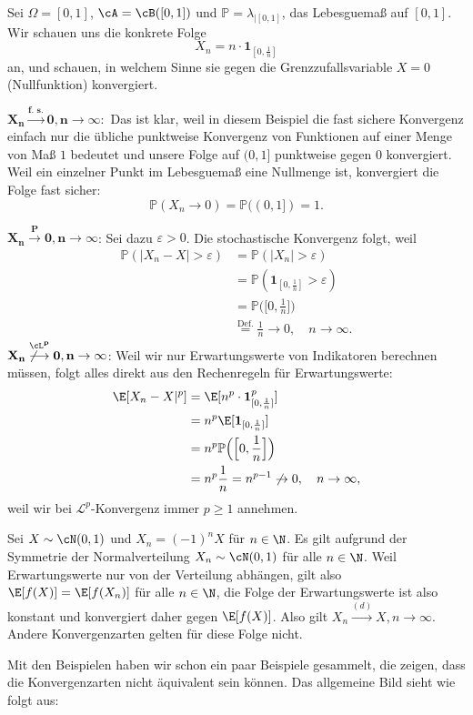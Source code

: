 \begin{beispiel}
	Sei $\Omega = [0,1]$, $\cA = \cB([0,1])$ und $\mathbb{P} = \lambda_{|[0,1]}$, das Lebesguema\ss{} auf $[0,1]$. Wir schauen uns die konkrete Folge $$X_n = n \cdot \mathbf{1}_{[0,\frac{1}{n}]}$$ an, und schauen, in welchem Sinne sie gegen die Grenzzufallsvariable $X=0$ (Nullfunktion) konvergiert. \smallskip
			
	$\mathbf{X_n \overset{\text{f. s.}}{\longrightarrow} 0, n \to \infty:}$ Das ist klar, weil in diesem Beispiel die fast sichere Konvergenz einfach nur die \"ubliche punktweise Konvergenz von Funktionen auf einer Menge von Ma\ss{} $1$ bedeutet und unsere Folge auf $(0,1]$ punktweise gegen $0$ konvergiert. Weil ein einzelner Punkt im Lebesguema\ss{} eine Nullmenge ist, konvergiert die Folge fast sicher:	
	$$\mathbb{P}(X_n \to 0) = \mathbb{P}((0,1]) = 1.$$
	
	$\mathbf{X_n \overset{P}{\longrightarrow} 0, n \to \infty}$:	Sei dazu $\varepsilon > 0$. Die stochastische Konvergenz folgt, weil
	\begin{align*}
		\mathbb{P}(|X_n-X| > \varepsilon) &= \mathbb{P}(|X_n| > \varepsilon) \\
		&= \mathbb{P}(\mathbf{1}_{[0,\frac{1}{n}]} > \varepsilon)\\
		& = \mathbb{P}\Big(\Big[0,\frac{1}{n}\Big]\Big)\\
		&\overset{\text{Def.}}{ =} \frac{1}{n} \to 0, \quad n\to\infty.
	\end{align*}	
	$\mathbf{X_n \overset{\cL^p}{\not\longrightarrow} 0, n \to \infty}$: Weil wir nur Erwartungswerte von Indikatoren berechnen m\"ussen, folgt alles direkt aus den Rechenregeln f\"ur Erwartungswerte:
	\begin{align*}
		\E[X_n-X|^p] & = \E[n^p \cdot \mathbf{1}_{[0,\frac{1}{n}]}^p]\\
		& = n^p \E[ \mathbf{1}_{[0,\frac{1}{n}]}] \\
		&= n^p \mathbb{P}\Big(\Big[0,\frac{1}{n}\Big]\Big) \\
		&= n^p  \frac{1}{n} = n^{p-1} \not\to 0,\quad  n \to \infty,
	\end{align*}
	weil wir bei $\mathcal L^p$-Konvergenz immer $p\geq 1$ annehmen.
\end{beispiel}
\begin{beispiel}
	Sei $X \sim \cN(0,1)$ und $X_n = (-1)^n X$ f\"ur $n\in \N$. Es gilt aufgrund der Symmetrie der Normalverteilung $X_n \sim \cN(0,1)$ f\"ur alle $n\in\N$. Weil Erwartungswerte nur von der Verteilung abh\"angen, gilt also $\E[f(X)]=\E[f(X_n)]$ f\"ur alle $n\in\N$, die Folge der Erwartungswerte ist also konstant und konvergiert daher gegen $\E[f(X)]$. Also gilt $X_n \overset{(d)}{\longrightarrow} X, n\to\infty$. Andere Konvergenzarten gelten f\"ur diese Folge nicht.
\end{beispiel}
Mit den Beispielen haben wir schon ein paar Beispiele gesammelt, die zeigen, dass die Konvergenzarten nicht \"aquivalent sein k\"onnen. Das allgemeine Bild sieht wie folgt aus:



